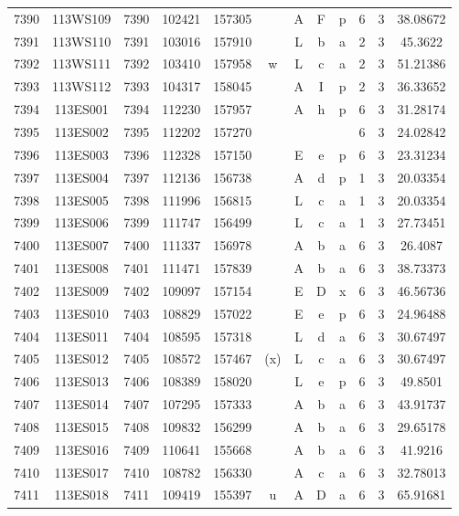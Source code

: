 \begin{tabular}{|*{12}{c|}}
7390 & 113WS109 & 7390 & 102421 & 157305 &  & A & F & p & 6 & 3 & 38.08672 \\ 
7391 & 113WS110 & 7391 & 103016 & 157910 &  & L & b & a & 2 & 3 & 45.3622 \\ 
7392 & 113WS111 & 7392 & 103410 & 157958 & w & L & c & a & 2 & 3 & 51.21386 \\ 
7393 & 113WS112 & 7393 & 104317 & 158045 &  & A & I & p & 2 & 3 & 36.33652 \\ 
7394 & 113ES001 & 7394 & 112230 & 157957 &  & A & h & p & 6 & 3 & 31.28174 \\ 
7395 & 113ES002 & 7395 & 112202 & 157270 &  &  &  &  & 6 & 3 & 24.02842 \\ 
7396 & 113ES003 & 7396 & 112328 & 157150 &  & E & e & p & 6 & 3 & 23.31234 \\ 
7397 & 113ES004 & 7397 & 112136 & 156738 &  & A & d & p & 1 & 3 & 20.03354 \\ 
7398 & 113ES005 & 7398 & 111996 & 156815 &  & L & c & a & 1 & 3 & 20.03354 \\ 
7399 & 113ES006 & 7399 & 111747 & 156499 &  & L & c & a & 1 & 3 & 27.73451 \\ 
7400 & 113ES007 & 7400 & 111337 & 156978 &  & A & b & a & 6 & 3 & 26.4087 \\ 
7401 & 113ES008 & 7401 & 111471 & 157839 &  & A & b & a & 6 & 3 & 38.73373 \\ 
7402 & 113ES009 & 7402 & 109097 & 157154 &  & E & D & x & 6 & 3 & 46.56736 \\ 
7403 & 113ES010 & 7403 & 108829 & 157022 &  & E & e & p & 6 & 3 & 24.96488 \\ 
7404 & 113ES011 & 7404 & 108595 & 157318 &  & L & d & a & 6 & 3 & 30.67497 \\ 
7405 & 113ES012 & 7405 & 108572 & 157467 & (x) & L & c & a & 6 & 3 & 30.67497 \\ 
7406 & 113ES013 & 7406 & 108389 & 158020 &  & L & e & p & 6 & 3 & 49.8501 \\ 
7407 & 113ES014 & 7407 & 107295 & 157333 &  & A & b & a & 6 & 3 & 43.91737 \\ 
7408 & 113ES015 & 7408 & 109832 & 156299 &  & A & b & a & 6 & 3 & 29.65178 \\ 
7409 & 113ES016 & 7409 & 110641 & 155668 &  & A & b & a & 6 & 3 & 41.9216 \\ 
7410 & 113ES017 & 7410 & 108782 & 156330 &  & A & c & a & 6 & 3 & 32.78013 \\ 
7411 & 113ES018 & 7411 & 109419 & 155397 & u & A & D & a & 6 & 3 & 65.91681 \\ 

\end{tabular}
